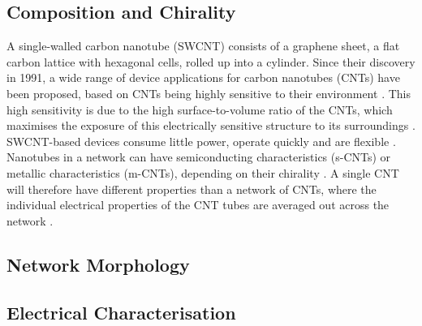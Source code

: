 \documentclass[
  a4paper,
]{scrbook}
\begin{document}
\hypertarget{composition-and-chirality}{%
\subsection{Composition and Chirality}\label{composition-and-chirality}}

A single-walled carbon nanotube (SWCNT) consists of a graphene sheet, a
flat carbon lattice with hexagonal cells, rolled up into a cylinder.
Since their discovery in 1991, a wide range of device applications for
carbon nanotubes (CNTs) have been proposed, based on CNTs being highly
sensitive to their environment
\autocite{Iijima1991,Battie2010,Boyd2014,Chen2019}. This high
sensitivity is due to the high surface-to-volume ratio of the CNTs,
which maximises the exposure of this electrically sensitive structure to
its surroundings \autocite{Battie2010}. SWCNT-based devices consume
little power, operate quickly and are flexible \autocite{Chen2019}.
Nanotubes in a network can have semiconducting characteristics (s-CNTs)
or metallic characteristics (m-CNTs), depending on their chirality
\autocite{Martel1998,Kong2000}. A single CNT will therefore have
different properties than a network of CNTs, where the individual
electrical properties of the CNT tubes are averaged out across the
network \autocite{Battie2010}.

\hypertarget{network-morphology}{%
\subsection{Network Morphology}\label{network-morphology}}

\hypertarget{sec-electrical-characterisation-CNT}{%
\subsection{Electrical
Characterisation}\label{sec-electrical-characterisation-CNT}}
\end{document}
